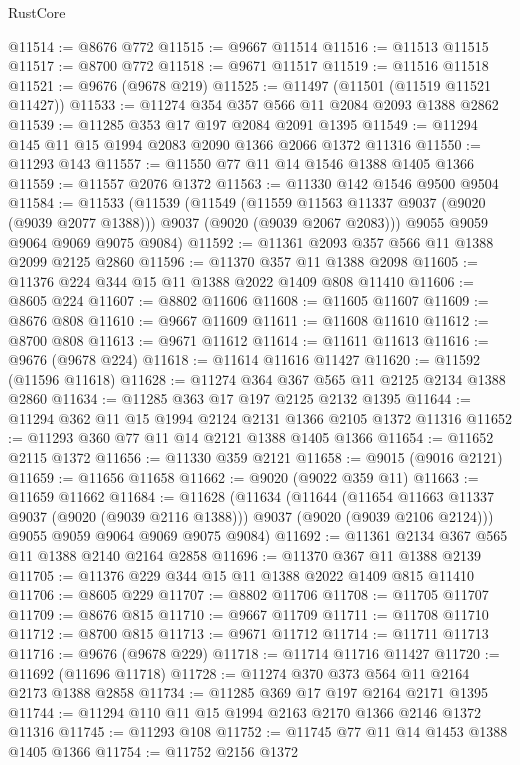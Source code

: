 \begin{lexlean}{RustCore}
\begin{coremodule}
@11514 := @8676 @772
@11515 := @9667 @11514
@11516 := @11513 @11515
@11517 := @8700 @772
@11518 := @9671 @11517
@11519 := @11516 @11518
@11521 := @9676 (@9678 @219)
@11525 := @11497 (@11501 (@11519 @11521 @11427))
@11533 := @11274 @354 @357 @566 @11 @2084 @2093 @1388 @2862
@11539 := @11285 @353 @17 @197 @2084 @2091 @1395
@11549 := @11294 @145 @11 @15 @1994 @2083 @2090 @1366 @2066 @1372 @11316
@11550 := @11293 @143
@11557 := @11550 @77 @11 @14 @1546 @1388 @1405 @1366
@11559 := @11557 @2076 @1372
@11563 := @11330 @142 @1546 @9500 @9504
@11584 := @11533
    (@11539
      (@11549
        (@11559 @11563 @11337 @9037 (@9020 (@9039 @2077 @1388)))
        @9037
        (@9020 (@9039 @2067 @2083)))
      @9055
      @9059
      @9064
      @9069
      @9075
      @9084)
@11592 := @11361 @2093 @357 @566 @11 @1388 @2099 @2125 @2860
@11596 := @11370 @357 @11 @1388 @2098
@11605 := @11376 @224 @344 @15 @11 @1388 @2022 @1409 @808 @11410
@11606 := @8605 @224
@11607 := @8802 @11606
@11608 := @11605 @11607
@11609 := @8676 @808
@11610 := @9667 @11609
@11611 := @11608 @11610
@11612 := @8700 @808
@11613 := @9671 @11612
@11614 := @11611 @11613
@11616 := @9676 (@9678 @224)
@11618 := @11614 @11616 @11427
@11620 := @11592 (@11596 @11618)
@11628 := @11274 @364 @367 @565 @11 @2125 @2134 @1388 @2860
@11634 := @11285 @363 @17 @197 @2125 @2132 @1395
@11644 := @11294 @362 @11 @15 @1994 @2124 @2131 @1366 @2105 @1372 @11316
@11652 := @11293 @360 @77 @11 @14 @2121 @1388 @1405 @1366
@11654 := @11652 @2115 @1372
@11656 := @11330 @359 @2121
@11658 := @9015 (@9016 @2121)
@11659 := @11656 @11658
@11662 := @9020 (@9022 @359 @11)
@11663 := @11659 @11662
@11684 := @11628
    (@11634
      (@11644
        (@11654 @11663 @11337 @9037 (@9020 (@9039 @2116 @1388)))
        @9037
        (@9020 (@9039 @2106 @2124)))
      @9055
      @9059
      @9064
      @9069
      @9075
      @9084)
@11692 := @11361 @2134 @367 @565 @11 @1388 @2140 @2164 @2858
@11696 := @11370 @367 @11 @1388 @2139
@11705 := @11376 @229 @344 @15 @11 @1388 @2022 @1409 @815 @11410
@11706 := @8605 @229
@11707 := @8802 @11706
@11708 := @11705 @11707
@11709 := @8676 @815
@11710 := @9667 @11709
@11711 := @11708 @11710
@11712 := @8700 @815
@11713 := @9671 @11712
@11714 := @11711 @11713
@11716 := @9676 (@9678 @229)
@11718 := @11714 @11716 @11427
@11720 := @11692 (@11696 @11718)
@11728 := @11274 @370 @373 @564 @11 @2164 @2173 @1388 @2858
@11734 := @11285 @369 @17 @197 @2164 @2171 @1395
@11744 := @11294 @110 @11 @15 @1994 @2163 @2170 @1366 @2146 @1372 @11316
@11745 := @11293 @108
@11752 := @11745 @77 @11 @14 @1453 @1388 @1405 @1366
@11754 := @11752 @2156 @1372

\end{coremodule}
\end{lexlean}
